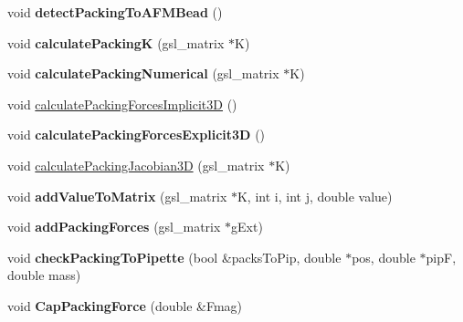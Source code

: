 \begin{DoxyCompactItemize}
\item 
\hypertarget{classSimulation_a44e5a4a5419d9d12cf0033ccd288b66c}{}void {\bfseries detect\+Packing\+To\+A\+F\+M\+Bead} ()\label{classSimulation_a44e5a4a5419d9d12cf0033ccd288b66c}

\item 
\hypertarget{classSimulation_a64a53ebf4200a7a0c4b58ccca52d008b}{}void {\bfseries calculate\+Packing\+K} (gsl\+\_\+matrix $\ast$K)\label{classSimulation_a64a53ebf4200a7a0c4b58ccca52d008b}

\item 
\hypertarget{classSimulation_a4e93c41adbaf7ab1d739c026043ab21f}{}void {\bfseries calculate\+Packing\+Numerical} (gsl\+\_\+matrix $\ast$K)\label{classSimulation_a4e93c41adbaf7ab1d739c026043ab21f}

\item 
void \hyperlink{classSimulation_a77e76f4fe61889b9c0ae18436a7fd2fb}{calculate\+Packing\+Forces\+Implicit3\+D} ()
\item 
\hypertarget{classSimulation_aa0ec2fc12dd35ba969ec27f728c3ee77}{}void {\bfseries calculate\+Packing\+Forces\+Explicit3\+D} ()\label{classSimulation_aa0ec2fc12dd35ba969ec27f728c3ee77}

\item 
void \hyperlink{classSimulation_a07d76a2495e1b863ab0cdb7185821bec}{calculate\+Packing\+Jacobian3\+D} (gsl\+\_\+matrix $\ast$K)
\item 
\hypertarget{classSimulation_ac096cfe7f8b3b7b66f6af2a87ff6556f}{}void {\bfseries add\+Value\+To\+Matrix} (gsl\+\_\+matrix $\ast$K, int i, int j, double value)\label{classSimulation_ac096cfe7f8b3b7b66f6af2a87ff6556f}

\item 
\hypertarget{classSimulation_a7a62be5131e130aa7f631201d5a4a49a}{}void {\bfseries add\+Packing\+Forces} (gsl\+\_\+matrix $\ast$g\+Ext)\label{classSimulation_a7a62be5131e130aa7f631201d5a4a49a}

\item 
\hypertarget{classSimulation_aa04a4380d3de7ffd60791cac5c1ea0ac}{}void {\bfseries check\+Packing\+To\+Pipette} (bool \&packs\+To\+Pip, double $\ast$pos, double $\ast$pip\+F, double mass)\label{classSimulation_aa04a4380d3de7ffd60791cac5c1ea0ac}

\item 
\hypertarget{classSimulation_a33120f358a608cf6ede1a45715a8f990}{}void {\bfseries Cap\+Packing\+Force} (double \&Fmag)\label{classSimulation_a33120f358a608cf6ede1a45715a8f990}


\end{DoxyCompactItemize}
